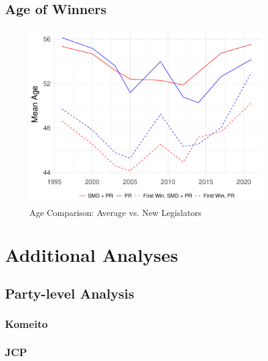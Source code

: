 \documentclass[a4paper, 11pt]{article}
\begin{document}
\newpage

\subsection{Age of Winners}

\begin{figure}[!htbp]
	\includegraphics[width = 0.9\textwidth]{../figure/paper/age_first_win.pdf}
	\caption{Age Comparison: Average vs. New Legislators}
	\label{fig:ageFirstWin}
\end{figure}	

\newpage

\section{Additional Analyses}

\subsection{Party-level Analysis}

\subsubsection*{Komeito}



\newpage

\subsubsection*{JCP}


\end{document}
